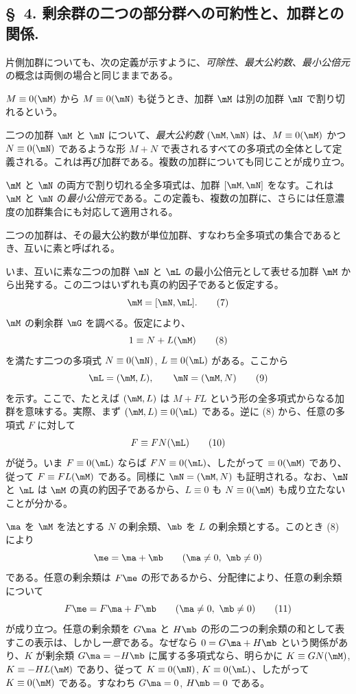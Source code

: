 \documentclass[11pt]{article}
\begin{document}
\subsection*{\S~4. 剰余群の二つの部分群への可約性と、加群との関係.}

片側加群についても、次の定義が示すように、\emph{可除性}、\emph{最大公約数}、\emph{最小公倍元}の概念は両側の場合と同じままである。

$M\equiv0(\mM)$ から $M\equiv0(\mN)$ も従うとき、加群 $\mM$ は別の加群 $\mN$ で割り切れるという。

二つの加群 $\mM$ と $\mN$ について、\emph{最大公約数} $(\mM,\mN)$ は、$M\equiv0(\mM)$ かつ $N\equiv0(\mN)$ であるような形 $M+N$ で表されるすべての多項式の全体として定義される。これは再び加群である。複数の加群についても同じことが成り立つ。

$\mM$ と $\mN$ の両方で割り切れる全多項式は、加群 $[\mM,\mN]$ をなす。これは $\mM$ と $\mN$ の\emph{最小公倍元}である。この定義も、複数の加群に、さらには任意濃度の加群集合にも対応して適用される。

二つの加群は、その最大公約数が単位加群、すなわち全多項式の集合であるとき、互いに素と呼ばれる。

いま、互いに素な二つの加群 $\mN$ と $\mL$ の最小公倍元として表せる加群 $\mM$ から出発する。この二つはいずれも真の約因子であると仮定する。
\begin{equation}
 \mM=[\mN,\mL].
\tag{7}
\end{equation}
$\mM$ の剰余群 $\mG$ を調べる。仮定により、
\begin{equation}
 1\equiv N+L(\mM)
\tag{8}
\end{equation}
を満たす二つの多項式 $N\equiv0(\mN)$, $L\equiv0(\mL)$ がある。ここから
\begin{equation}
 \mL=(\mM,L),\qquad \mN=(\mM,N)
\tag{9}
\end{equation}
を示す。ここで、たとえば $(\mM,L)$ は $M+FL$ という形の全多項式からなる加群を意味する。実際、まず $(\mM,L)\equiv0(\mL)$ である。逆に (8) から、任意の多項式 $F$ に対して
\begin{equation}
 F\equiv FN(\mL)
\tag{10}
\end{equation}
が従う。いま $F\equiv0(\mL)$ ならば $FN\equiv0(\mL)$、したがって $\equiv0(\mM)$ であり、従って $F\equiv FL(\mM)$ である。同様に $\mN=(\mM,N)$ も証明される。なお、$\mN$ と $\mL$ は $\mM$ の真の約因子であるから、$L\equiv0$ も $N\equiv0(\mM)$ も成り立たないことが分かる。

$\ma$ を $\mM$ を法とする $N$ の剰余類、$\mb$ を $L$ の剰余類とする。このとき (8) により
\[
 \me=\ma+\mb\qquad(\ma\ne0,\ \mb\ne0)
\]
である。任意の剰余類は $F\me$ の形であるから、分配律により、任意の剰余類について
\begin{equation}
 F\me=F\ma+F\mb\qquad(\ma\ne0,\ \mb\ne0)
\tag{11}
\end{equation}
が成り立つ。任意の剰余類を $G\ma$ と $H\mb$ の形の二つの剰余類の和として表すこの表示は、しかし\emph{一意}である。なぜなら $0=G\ma+H\mb$ という関係があり、$K$ が剰余類 $G\ma=-H\mb$ に属する多項式なら、明らかに $K\equiv GN(\mM)$, $K\equiv-HL(\mM)$ であり、従って $K\equiv0(\mN)$, $K\equiv0(\mL)$、したがって $K\equiv0(\mM)$ である。すなわち $G\ma=0$, $H\mb=0$ である。
\end{document}
